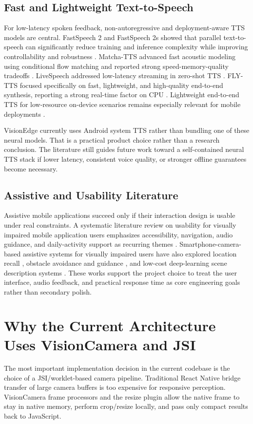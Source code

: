 \documentclass[conference]{IEEEtran}
\begin{document}
\subsection{Fast and Lightweight Text-to-Speech}
For low-latency spoken feedback, non-autoregressive and deployment-aware TTS models are central. FastSpeech 2 and FastSpeech 2s showed that parallel text-to-speech can significantly reduce training and inference complexity while improving controllability and robustness \cite{ren2021fastspeech2}. Matcha-TTS advanced fast acoustic modeling using conditional flow matching and reported strong speed-memory-quality tradeoffs \cite{mehta2024matchatts}. LiveSpeech addressed low-latency streaming in zero-shot TTS \cite{dang2024livespeech}. FLY-TTS focused specifically on fast, lightweight, and high-quality end-to-end synthesis, reporting a strong real-time factor on CPU \cite{guo2024flytts}. Lightweight end-to-end TTS for low-resource on-device scenarios remains especially relevant for mobile deployments \cite{vecino2023lightweighttts}.

VisionEdge currently uses Android system TTS rather than bundling one of these neural models. That is a practical product choice rather than a research conclusion. The literature still guides future work toward a self-contained neural TTS stack if lower latency, consistent voice quality, or stronger offline guarantees become necessary.

\subsection{Assistive and Usability Literature}
Assistive mobile applications succeed only if their interaction design is usable under real constraints. A systematic literature review on usability for visually impaired mobile application users emphasizes accessibility, navigation, audio guidance, and daily-activity support as recurring themes \cite{alrazgan2021slr}. Smartphone-camera-based assistive systems for visually impaired users have also explored location recall \cite{takizawa2017spotreminder}, obstacle avoidance and guidance \cite{lin2017guidingsystem}, and low-cost deep-learning scene description systems \cite{islam2023environmentdescription}. These works support the project choice to treat the user interface, audio feedback, and practical response time as core engineering goals rather than secondary polish.

\section{Why the Current Architecture Uses VisionCamera and JSI}
The most important implementation decision in the current codebase is the choice of a JSI/worklet-based camera pipeline. Traditional React Native bridge transfer of large camera buffers is too expensive for responsive perception. VisionCamera frame processors and the resize plugin allow the native frame to stay in native memory, perform crop/resize locally, and pass only compact results back to JavaScript.
\end{document}
